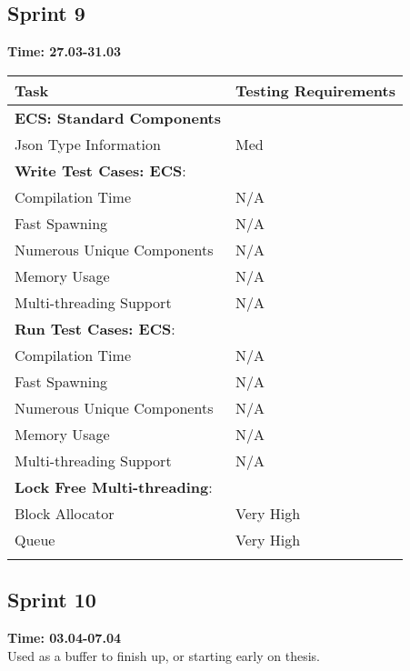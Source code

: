 \documentclass[hidelinks]{article}
\begin{document}
\subsection{Sprint 9}
\textbf{Time: 27.03-31.03}\\
\begin{tabularx}{\textwidth}{l >{\centering\arraybackslash}X}
\hline\noalign{\smallskip}
  Task                                  & Testing Requirements   \\
\hline\noalign{\smallskip}
  \textbf{ECS: Standard Components}     &                        \\
  Json Type Information                 & Med                    \\

  \textbf{Write Test Cases: ECS}:       &                        \\
  Compilation Time                      & N/A                    \\
  Fast Spawning                         & N/A                    \\
  Numerous Unique Components            & N/A                    \\
  Memory Usage                          & N/A                    \\
  Multi-threading Support               & N/A                    \\

  \textbf{Run Test Cases: ECS}:         &                        \\
  Compilation Time                      & N/A                    \\
  Fast Spawning                         & N/A                    \\
  Numerous Unique Components            & N/A                    \\
  Memory Usage                          & N/A                    \\
  Multi-threading Support               & N/A                    \\

  \textbf{Lock Free Multi-threading}:   &                        \\
  Block Allocator                       & Very High              \\
  Queue                                 & Very High              \\
\hline\noalign{\smallskip}
\end{tabularx}

\subsection{Sprint 10}
\textbf{Time: 03.04-07.04}\\
Used as a buffer to finish up, or starting early on thesis.
\end{document}
